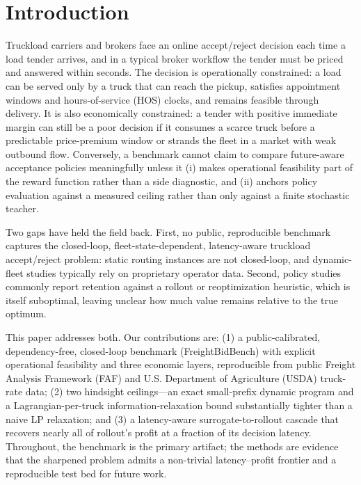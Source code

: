 \documentclass[numbered]{trbunofficial}
\begin{document}
\section{Introduction}
Truckload carriers and brokers face an online accept/reject decision each
time a load tender arrives, and in a typical broker workflow the tender
must be priced and answered within seconds. The decision is operationally
constrained: a load can be served only by a truck that can reach the
pickup, satisfies appointment windows and hours-of-service (HOS) clocks,
and remains feasible through delivery. It is also economically
constrained: a tender with positive immediate margin can still be a poor
decision if it consumes a scarce truck before a predictable price-premium
window or strands the fleet in a market with weak outbound flow.
Conversely, a benchmark cannot claim to compare future-aware acceptance
policies meaningfully unless it (i) makes operational feasibility part of
the reward function rather than a side diagnostic, and (ii) anchors policy
evaluation against a measured ceiling rather than only against a finite
stochastic teacher.

Two gaps have held the field back. First, no public, reproducible
benchmark captures the closed-loop, fleet-state-dependent, latency-aware
truckload accept/reject problem: static routing instances are not
closed-loop, and dynamic-fleet studies typically rely on proprietary
operator data. Second, policy studies commonly report retention against a
rollout or reoptimization heuristic, which is itself suboptimal, leaving
unclear how much value remains relative to the true optimum.

This paper addresses both. Our contributions are: (1) a
public-calibrated, dependency-free, closed-loop benchmark
(FreightBidBench) with explicit operational feasibility and three economic
layers, reproducible from public Freight Analysis Framework (FAF) and
U.S. Department of Agriculture (USDA) truck-rate data; (2) two hindsight
ceilings---an exact small-prefix dynamic program and a Lagrangian-per-truck
information-relaxation bound substantially tighter than a naive LP
relaxation; and (3) a latency-aware surrogate-to-rollout cascade that
recovers nearly all of rollout's profit at a fraction of its decision
latency. Throughout, the benchmark is the primary artifact; the methods
are evidence that the sharpened problem admits a non-trivial
latency--profit frontier and a reproducible test bed for future work.
\end{document}
